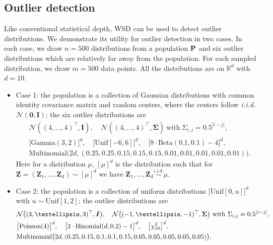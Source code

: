 \documentclass{imsart}
\numberwithin{equation}{section}
\def\R{\mathbb{R}}
\def\bSigma{\boldsymbol{\Sigma}}
\begin{document}
\subsection{Outlier detection}\label{subsection:outlier_detect}
Like conventional statistical depth, WSD can be used to detect outlier distributions. 
We demonstrate its utility for outlier detection in two cases. In each case, we draw $n=500$ distributions from a population ${\bf P}$ and six outlier distributions which are relatively far away from the population. For each sampled distribution, we draw $m=500$ data points.  All the distributions are on $\R^d$ with $d=10$. 
\begin{itemize}
	\item Case 1: the population is a collection of Gaussian distributions with common identity covariance matrix and random centers, where the centers follow \textit{i.i.d.} $\mathcal{N}(\mathbf{0}, \boldsymbol{I})$; 
	the six outlier distributions are 
	\begin{align*}
		&\mathcal{N}((4, \ldots, 4)^\top, \boldsymbol{I}),\quad \mathcal{N}((4, \ldots, 4)^\top, \bSigma)\ \text{with}\ \Sigma_{i,j}=0.5^{|i-j|},\\
		&\big[ \mathrm{Gamma}(3,2) \big]^d,\quad \big[ \mathrm{Unif}[-6, 6] \big]^d, \quad \big[ 8\cdot\mathrm{Beta}(0.1, 0.1)-4 \big]^d,\\
		&\mathrm{Multinomial}\big(2d, (0.25, 0.25, 0.15, 0.15, 0.15, 0.01, 0.01, 0.01, 0.01, 0.01)\big).
	\end{align*}
	Here for a distribution $\mu$, $[\mu]^d$ is the distribution such that for
	$\mathbf{Z} = (\mathbf{Z}_1 , \ldots , \mathbf{Z}_d) \sim [\mu]^d $ we have $\mathbf{Z}_1 , \ldots , \mathbf{Z}_d 
	\stackrel{\textit{i.i.d.}}{\sim} 
	\mu$.
	\item Case 2: the population is a collection of uniform distributions $\big[ \mathrm{Unif}[0, u] \big]^d$ with $u\sim \mathrm{Unif}[1,2]$; the outlier distributions are 
	\begin{align*}
		&\mathcal{N}\big( (3, \ldots, 3)^\top, \boldsymbol{I} \big), \quad \mathcal{N}\big( (-1, \ldots, -1)^\top, \bSigma \big)\ \text{with}\ \Sigma_{i,j}=0.5^{|i-j|},\\
		&\big[\mathrm{Poisson}(4)\big]^d, \quad \big[2\cdot\mathrm{Binomial}(d, 0.2)-1\big]^d, \quad \big[\chi^2_{10}\big]^d ,\\
		&\mathrm{Multinomial}\big(2d, (0.25, 0.15, 0.1, 0.1,\linebreak[1] 0.15, 0.05, 0.05, 0.05, 0.05, 0.05)\big).
	\end{align*}
\end{itemize}
\end{document}
